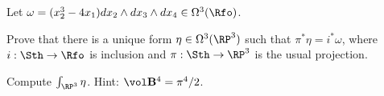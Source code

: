 Let $\omega=(x_2^3-4x_1)dx_2\wedge dx_3\wedge dx_4\in \Omega^3(\Rfo)$.
\begin{alist}
\item Prove that there is a unique form $\eta\in \Omega^3(\RP^3)$ such
that $\pi^*\eta=i^*\omega$, where $i:\Sth\rightarrow \Rfo$ is
inclusion and $\pi:\Sth\rightarrow \RP^3$ is the usual projection.
\item Compute $\int_{\RP^3}\eta$. Hint: $\vol \mathbf{B}^4=\pi^4/2$.
\end{alist}
